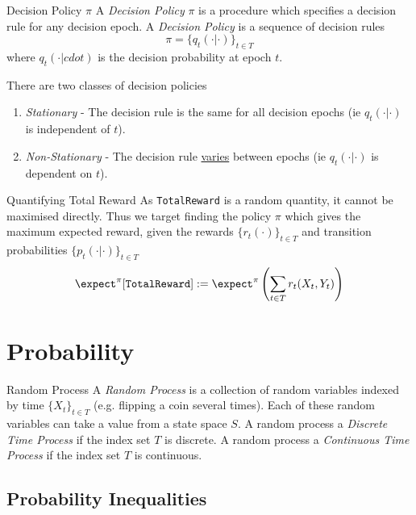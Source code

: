 \documentclass[11pt,a4paper]{article}
\begin{document}
  \begin{definition}{Decision Policy $\pi$}
    A \textit{Decision Policy} $\pi$ is a procedure which specifies a decision rule for any decision epoch. A \textit{Decision Policy} is a sequence of decision rules
    \[ \pi=\{q_t(\cdot|\cdot)\}_{t\in T} \]
    where $q_t(\cdot|cdot)$ is the decision probability at epoch $t$.
    \par There are two classes of decision policies
    \begin{enumerate}
      \item \textit{Stationary} - The decision rule is the same for all decision epochs (ie $q_t(\cdot|\cdot)$ is independent of $t$).
      \item \textit{Non-Stationary} - The decision rule \underline{varies} between epochs (ie $q_t(\cdot|\cdot)$ is dependent on $t$).
    \end{enumerate}
  \end{definition}

  \begin{remark}{Quantifying Total Reward}
    As \texttt{TotalReward} is a random quantity, it cannot be maximised directly. Thus we target finding the policy $\pi$ which gives the maximum expected reward, given the rewards $\{r_t(\cdot)\}_{t\in T}$ and transition probabilities $\{p_t(\cdot|\cdot)\}_{t\in T}$
    \[ \expect^\pi[\mathtt{TotalReward}]:=\expect^\pi\left(\sum_{t\in T}r_t(X_t,Y_t)\right) \]

  \end{remark}

\section{Probability}

  \begin{definition}{Random Process}
    A \textit{Random Process} is a collection of random variables indexed by time $\{X_t\}_{t\in T}$ (e.g. flipping a coin several times). Each of these random variables can take a value from a state space $S$. A random process a \textit{Discrete Time Process} if the index set $T$ is discrete. A random process a \textit{Continuous Time Process} if the index set $T$ is continuous.
  \end{definition}

\subsection{Probability Inequalities}
\end{document}

